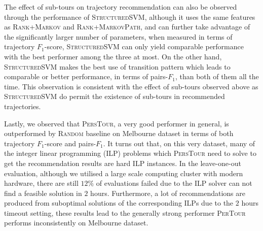 The effect of sub-tours on trajectory recommendation can also be observed through the performance of \textsc{StructuredSVM},
%
although it uses the same features as \textsc{Rank+Markov} and \textsc{Rank+MarkovPath},
and can further take advantage of the significantly larger number of parameters,
when measured in terms of trajectory $F_1$-score, \textsc{StructuredSVM} can only yield comparable performance
with the best performer among the three at most.
On the other hand, \textsc{StructuredSVM} makes the best use of transition pattern which leads to comparable or
better performance, in terms of pairs-$F_1$, than both of them all the time.
This observation is consistent with the effect of sub-tours observed above
as \textsc{StructuredSVM} do permit the existence of sub-tours in recommended trajectories.

Lastly, we observed that \textsc{PersTour}, a very good performer in general, is outperformed by \textsc{Random} baseline
on Melbourne dataset in terms of both trajectory $F_1$-score and pairs-$F_1$.
It turns out that, on this very dataset, many of the integer linear programming (ILP) problems 
which \textsc{PersTour} need to solve to get the recommendation results are hard ILP instances.
In the leave-one-out evaluation, although we utilised a large scale computing cluster with modern hardware,
there are still $12\%$ of evaluations failed due to the ILP solver can not find a feasible solution in $2$ hours.
Furthermore, a lot of recommendations are produced from suboptimal solutions of the corresponding ILPs due to 
the $2$ hours timeout setting, these results lead to the generally strong performer \textsc{PerTour} performs 
inconsistently on Melbourne dataset.
